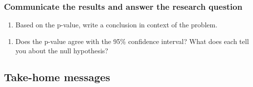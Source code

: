 \documentclass[
]{report}
\providecommand{\tightlist}{%
  \setlength{\itemsep}{0pt}\setlength{\parskip}{0pt}}
\begin{document}
\vspace{.8in}

\hypertarget{communicate-the-results-and-answer-the-research-question-6}{%
\subsubsection*{Communicate the results and answer the research question}\label{communicate-the-results-and-answer-the-research-question-6}}

\begin{enumerate}
\def\labelenumi{\arabic{enumi}.}
\setcounter{enumi}{17}
\tightlist
\item
  Based on the p-value, write a conclusion in context of the problem.
\end{enumerate}

\vspace{.8in}

\begin{enumerate}
\def\labelenumi{\arabic{enumi}.}
\setcounter{enumi}{18}
\tightlist
\item
  Does the p-value agree with the 95\% confidence interval? What does each tell you about the null hypothesis?
\end{enumerate}

\vspace{.6in}

\hypertarget{take-home-messages-23}{%
\subsection{Take-home messages}\label{take-home-messages-23}}
\end{document}
